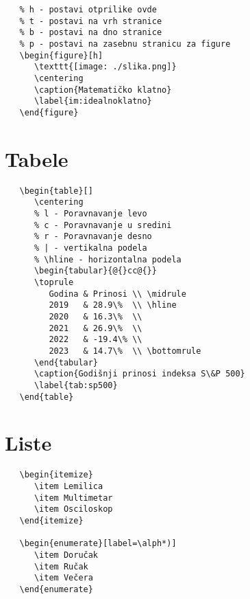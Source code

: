 \documentclass[a4paper]{article}
\begin{document}
\begin{verbatim}
   % h - postavi otprilike ovde
   % t - postavi na vrh stranice
   % b - postavi na dno stranice
   % p - postavi na zasebnu stranicu za figure
   \begin{figure}[h]
      \texttt{[image: ./slika.png]}
      \centering
      \caption{Matematičko klatno}
      \label{im:idealnoklatno}
   \end{figure}
\end{verbatim}

\pagebreak

\section*{Tabele}

\begin{verbatim}
   \begin{table}[]
      \centering
      % l - Poravnavanje levo
      % c - Poravnavanje u sredini
      % r - Poravnavanje desno
      % | - vertikalna podela
      % \hline - horizontalna podela
      \begin{tabular}{@{}cc@{}}
      \toprule
         Godina & Prinosi \\ \midrule
         2019   & 28.9\%  \\ \hline
         2020   & 16.3\%  \\
         2021   & 26.9\%  \\
         2022   & -19.4\% \\
         2023   & 14.7\%  \\ \bottomrule
      \end{tabular}
      \caption{Godišnji prinosi indeksa S\&P 500}
      \label{tab:sp500}
   \end{table}
\end{verbatim}

\pagebreak

\section*{Liste}

\begin{verbatim}
   \begin{itemize}
      \item Lemilica
      \item Multimetar
      \item Osciloskop
   \end{itemize}

   \begin{enumerate}[label=\alph*)]
      \item Doručak
      \item Ručak
      \item Večera
   \end{enumerate}
\end{verbatim}
\end{document}
